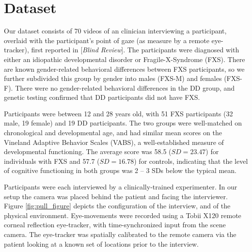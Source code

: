 \documentclass{llncs}
\begin{document}
  \section{Dataset}
  \vspace{-1.5em}
Our dataset consists of 70 videos of an clinician interviewing a participant, overlaid with the participant's point of gaze (as measure by a remote eye-tracker), first reported in [{\it Blind Review}]. %
The participants were diagnosed with either an idiopathic developmental disorder or Fragile-X-Syndrome (FXS). There are known gender-related behavioral differences between FXS participants, so we further subdivided this group by gender into males (FXS-M) and females (FXS-F). There were no gender-related behavioral differences in the DD group, and genetic testing confirmed that DD participants did not have FXS.

  Participants were between 12 and 28 years old, with 51 FXS participants (32 male, 19 female) and 19 DD participants. The two groups were well-matched on chronological and developmental age, and had similar mean scores on the Vineland Adaptive Behavior Scales (VABS), a well-established measure of developmental functioning. The average score was 58.5 ($SD = 23.47$) for individuals with FXS and 57.7 ($SD= 16.78$) for controls, indicating that the level of cognitive functioning in both groups was 2 -- 3 SDs below the typical mean.

  Participants were each interviewed by a clinically-trained experimenter. In our setup the camera was placed behind the patient and facing the interviewer. Figure \ref{fig:pull_figure} depicts the configuration of the interview, and of the physical environment. Eye-movements were recorded using a Tobii X120 remote corneal reflection eye-tracker, with time-synchronized input from the scene camera. The eye-tracker was spatially calibrated to the remote camera via the patient looking at a known set of locations prior to the interview.
\end{document}
